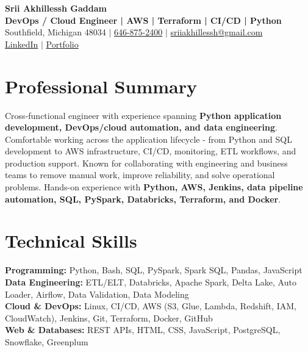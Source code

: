 \documentclass[letterpaper,10pt]{article}
\begin{document}
\fontsize{9.35pt}{10.45pt}\selectfont

\begin{center}
    {\LARGE \textbf{Srii Akhillessh Gaddam}} \\[-1pt]
    \textbf{DevOps / Cloud Engineer | AWS | Terraform | CI/CD | Python} \\[2pt]
    Southfield, Michigan 48034 $|$
    \href{tel:6468752400}{646-875-2400} $|$
    \href{mailto:sriiakhillessh@gmail.com}{sriiakhillessh@gmail.com} \\[1pt]
    \href{https://www.linkedin.com/in/srii-akhiilessh-gaddam-b48668191/}{LinkedIn} $|$
    \href{https://sriiakhillesshg.github.io/portfolio/}{Portfolio}
\end{center}
\vspace{-8pt}

\section{Professional Summary}
\small{Cross-functional engineer with experience spanning \textbf{Python application development, DevOps/cloud automation, and data engineering}. Comfortable working across the application lifecycle - from Python and SQL development to AWS infrastructure, CI/CD, monitoring, ETL workflows, and production support. Known for collaborating with engineering and business teams to remove manual work, improve reliability, and solve operational problems. Hands-on experience with \textbf{Python, AWS, Jenkins, data pipeline automation, SQL, PySpark, Databricks, Terraform, and Docker}.}

\section{Technical Skills}
\small{
\textbf{Programming:} Python, Bash, SQL, PySpark, Spark SQL, Pandas, JavaScript \\
\textbf{Data Engineering:} ETL/ELT, Databricks, Apache Spark, Delta Lake, Auto Loader, Airflow, Data Validation, Data Modeling \\
\textbf{Cloud \& DevOps:} Linux, CI/CD, AWS (S3, Glue, Lambda, Redshift, IAM, CloudWatch), Jenkins, Git, Terraform, Docker, GitHub \\
\textbf{Web \& Databases:} REST APIs, HTML, CSS, JavaScript, PostgreSQL, Snowflake, Greenplum
}
\end{document}

